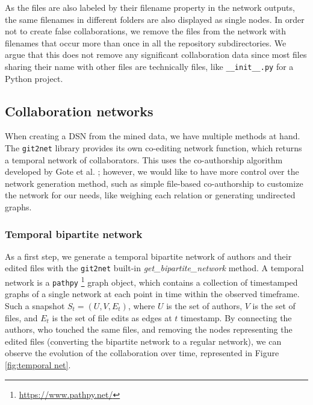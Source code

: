 As the files are also labeled by their filename property in the network outputs, the same filenames in different folders are also displayed as single nodes. In order not to create false collaborations, we remove the files from the network with filenames that occur more than once in all the repository subdirectories. We argue that this does not remove any significant collaboration data since most files sharing their name with other files are technically files, like \texttt{\_\_init\_\_.py} for a Python project.

\subsection{Collaboration networks}

When creating a DSN from the mined data, we have multiple methods at hand. The \texttt{git2net} library provides its own co-editing network function, which returns a temporal network of collaborators. This uses the co-authorship algorithm developed by Gote et al. \cite{goteAnalysingTimeStampedCoEditing2019}; however, we would like to have more control over the network generation method, such as simple file-based co-authorship to customize the network for our needs, like weighing each relation or generating undirected graphs.

\subsubsection{Temporal bipartite network}
As a first step, we generate a temporal bipartite network of authors and their edited files with the \texttt{git2net} built-in \textit{get\_bipartite\_network} method. A temporal network is a \texttt{pathpy} \footnote{\url{https://www.pathpy.net/}} graph object, which contains a collection of timestamped graphs of a single network at each point in time within the observed timeframe. Such a snapshot $S_t = (U, V, E_t)$, where $U$ is the set of authors, $V$ is the set of files, and $E_t$ is the set of file edits as edges at $t$ timestamp. By connecting the authors, who touched the same files, and removing the nodes representing the edited files (converting the bipartite network to a regular network), we can observe the evolution of the collaboration over time, represented in Figure \ref{fig:temporal net}.

